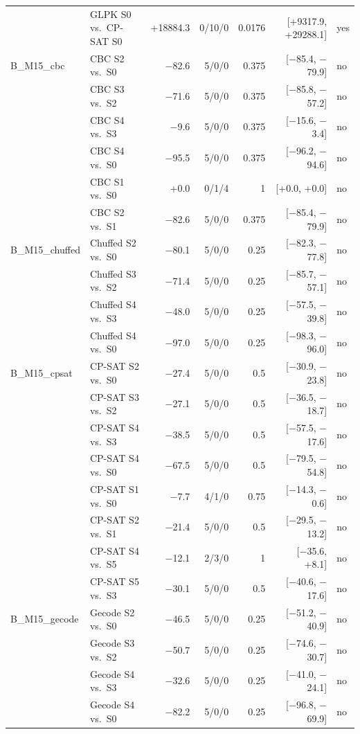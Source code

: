 \begin{longtable}{llrrrrl}
 & GLPK S0 vs.\ CP-SAT S0 & +18884.3 & 0/10/0 & 0.0176 & [+9317.9, +29288.1] & yes \\
B\_M15\_cbc & CBC S2 vs.\ S0 & $-$82.6 & 5/0/0 & 0.375 & [$-$85.4, $-$79.9] & no \\
 & CBC S3 vs.\ S2 & $-$71.6 & 5/0/0 & 0.375 & [$-$85.8, $-$57.2] & no \\
 & CBC S4 vs.\ S3 & $-$9.6 & 5/0/0 & 0.375 & [$-$15.6, $-$3.4] & no \\
 & CBC S4 vs.\ S0 & $-$95.5 & 5/0/0 & 0.375 & [$-$96.2, $-$94.6] & no \\
 & CBC S1 vs.\ S0 & +0.0 & 0/1/4 & 1 & [+0.0, +0.0] & no \\
 & CBC S2 vs.\ S1 & $-$82.6 & 5/0/0 & 0.375 & [$-$85.4, $-$79.9] & no \\
B\_M15\_chuffed & Chuffed S2 vs.\ S0 & $-$80.1 & 5/0/0 & 0.25 & [$-$82.3, $-$77.8] & no \\
 & Chuffed S3 vs.\ S2 & $-$71.4 & 5/0/0 & 0.25 & [$-$85.7, $-$57.1] & no \\
 & Chuffed S4 vs.\ S3 & $-$48.0 & 5/0/0 & 0.25 & [$-$57.5, $-$39.8] & no \\
 & Chuffed S4 vs.\ S0 & $-$97.0 & 5/0/0 & 0.25 & [$-$98.3, $-$96.0] & no \\
B\_M15\_cpsat & CP-SAT S2 vs.\ S0 & $-$27.4 & 5/0/0 & 0.5 & [$-$30.9, $-$23.8] & no \\
 & CP-SAT S3 vs.\ S2 & $-$27.1 & 5/0/0 & 0.5 & [$-$36.5, $-$18.7] & no \\
 & CP-SAT S4 vs.\ S3 & $-$38.5 & 5/0/0 & 0.5 & [$-$57.5, $-$17.6] & no \\
 & CP-SAT S4 vs.\ S0 & $-$67.5 & 5/0/0 & 0.5 & [$-$79.5, $-$54.8] & no \\
 & CP-SAT S1 vs.\ S0 & $-$7.7 & 4/1/0 & 0.75 & [$-$14.3, $-$0.6] & no \\
 & CP-SAT S2 vs.\ S1 & $-$21.4 & 5/0/0 & 0.5 & [$-$29.5, $-$13.2] & no \\
 & CP-SAT S4 vs.\ S5 & $-$12.1 & 2/3/0 & 1 & [$-$35.6, +8.1] & no \\
 & CP-SAT S5 vs.\ S3 & $-$30.1 & 5/0/0 & 0.5 & [$-$40.6, $-$17.6] & no \\
B\_M15\_gecode & Gecode S2 vs.\ S0 & $-$46.5 & 5/0/0 & 0.25 & [$-$51.2, $-$40.9] & no \\
 & Gecode S3 vs.\ S2 & $-$50.7 & 5/0/0 & 0.25 & [$-$74.6, $-$30.7] & no \\
 & Gecode S4 vs.\ S3 & $-$32.6 & 5/0/0 & 0.25 & [$-$41.0, $-$24.1] & no \\
 & Gecode S4 vs.\ S0 & $-$82.2 & 5/0/0 & 0.25 & [$-$96.8, $-$69.9] & no \\

\end{longtable}
